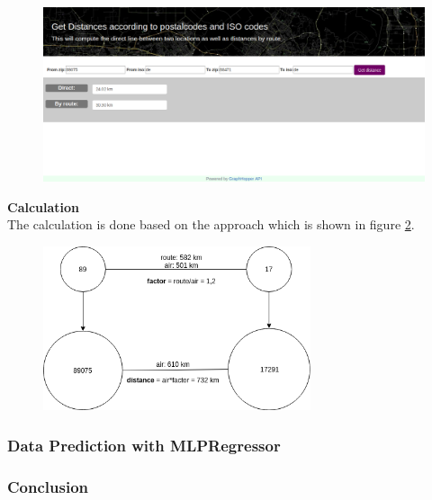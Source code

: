 \begin{figure}[H]
\hspace{-2.0cm}
\includegraphics[width=1.3\textwidth]{img/webapp}
\label{fig:webapp}
\end{figure}
\noindent\textbf{Calculation}\\
The calculation is done based on the approach which is shown in figure \ref{fig:calc}.
\begin{figure}[H]
\centering
\includegraphics[width=0.7\textwidth]{img/calc}
\label{fig:calc}
\end{figure}

\subsubsection{Data Prediction with MLPRegressor}\label{data_prediction}

\subsubsection{Conclusion}
